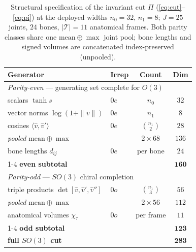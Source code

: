 \begin{table}[!t]
\centering
\caption{Structural specification of the invariant cut $\Pi$ (\eqref{eq:cut}--\eqref{eq:pi}) at the
deployed widths $n_0=32$, $n_1=8$; $J=25$ joints, $24$ bones, $|\mathcal{T}|=11$ anatomical frames.
Both parity classes share one $\mathrm{mean}\oplus\max$ joint pool; bone lengths and signed volumes
are concatenated index-preserved (unpooled).}
\label{tab:invsets}
\footnotesize
\setlength{\tabcolsep}{4pt}
\begin{tabular}{llcc}
\toprule
Generator & Irrep & Count & Dim \\
\midrule
\multicolumn{4}{l}{\emph{Parity-even} --- generating set complete for $O(3)$}\\
\quad scalars $\tanh s$                      & $0e$ & $n_0$            & $32$ \\
\quad vector norms $\log(1{+}\|v\|)$         & $0e$ & $n_1$            & $8$ \\
\quad cosines $\langle\hat v,\hat v'\rangle$ & $0e$ & $\binom{n_1}{2}$ & $28$ \\
\quad\emph{pooled} $\mathrm{mean}\oplus\max$ &      & $2\times68$      & $136$ \\
\quad bone lengths $d_{ij}$                  & $0e$ & per bone         & $24$ \\
\cmidrule(lr){1-4}
\quad\textbf{even subtotal}                  &      &                  & $\mathbf{160}$ \\
\midrule
\multicolumn{4}{l}{\emph{Parity-odd} --- $SO(3)$ chiral completion}\\
\quad triple products $\det[\hat v,\hat v',\hat v'']$ & $0o$ & $\binom{n_1}{3}$ & $56$ \\
\quad\emph{pooled} $\mathrm{mean}\oplus\max$ &      & $2\times56$      & $112$ \\
\quad anatomical volumes $\chi_\tau$         & $0o$ & per frame        & $11$ \\
\cmidrule(lr){1-4}
\quad\textbf{odd subtotal}                   &      &                  & $\mathbf{123}$ \\
\midrule
\quad\textbf{full $SO(3)$ cut}               &      &                  & $\mathbf{283}$ \\
\bottomrule
\end{tabular}
\end{table}

